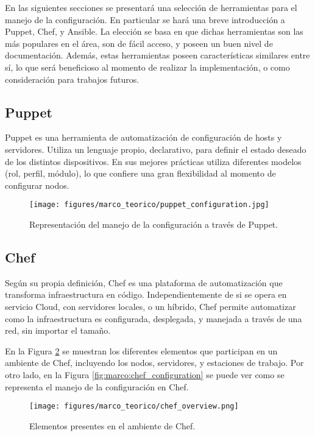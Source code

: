 En las siguientes secciones se presentará una selección de herramientas para el manejo de la configuración. En particular se hará una breve introducción a Puppet, Chef, y Ansible. La elección se basa en que dichas herramientas son las más populares en el área, son de fácil acceso, y poseen un buen nivel de documentación. Además, estas herramientas poseen características similares entre sí, lo que será beneficioso al momento de realizar la implementación, o como consideración para trabajos futuros.

\subsection{Puppet}

Puppet es una herramienta de automatización de configuración de hosts y servidores.
Utiliza un lenguaje propio, declarativo, para definir el estado deseado de los distintos dispositivos.
En sus mejores prácticas utiliza diferentes modelos (rol, perfil, módulo), lo que confiere una gran flexibilidad al momento de configurar nodos.

\begin{figure}[htbp]
    \centering
    \texttt{[image: figures/marco\_teorico/puppet\_configuration.jpg]}
    \caption{Representación del manejo de la configuración a través de Puppet.\cite{chefvspuppet}}
    \label{fig:marco:puppet_configuration}
\end{figure}

\subsection{Chef}
Según su propia definición, Chef es una plataforma de automatización que transforma infraestructura en código. Independientemente de si se opera en servicio Cloud, con servidores locales, o un híbrido, Chef permite automatizar como la infraestructura es configurada, desplegada, y manejada a través de una red, sin importar el tamaño. \cite{chefoverview}

En la Figura \ref{fig:marco:chef_overview} se muestran los diferentes elementos que participan en un ambiente de Chef, incluyendo los nodos, servidores, y estaciones de trabajo. Por otro lado, en la Figura \ref{fig:marco:chef_configuration} se puede ver como se representa el manejo de la configuración en Chef.

\begin{figure}[htbp]
    \centering
    \texttt{[image: figures/marco\_teorico/chef\_overview.png]}
    \caption{Elementos presentes en el ambiente de Chef. \cite{chefoverview}}
    \label{fig:marco:chef_overview}
\end{figure}


